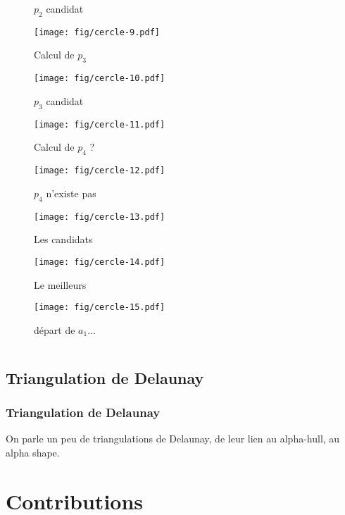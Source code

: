 \documentclass{beamer}
\begin{document}
\begin{frame}
\begin{columns}[t]
\begin{column}{4cm}
{\begin{figure}[h!]
    \caption{$p_{2}$ candidat}
\end{figure}
}
{
  \begin{figure}[h!]
    \centering
    \texttt{[image: fig/cercle-9.pdf]}
    \caption{Calcul de $p_{3}$}
\end{figure}
}
{
  \begin{figure}[h!]
    \centering
    \texttt{[image: fig/cercle-10.pdf]}
    \caption{$p_{3}$ candidat}
\end{figure}
}
{
  \begin{figure}[h!]
    \centering
    \texttt{[image: fig/cercle-11.pdf]}
    \caption{Calcul de $p_{4}$ ?}
\end{figure}
}
{
  \begin{figure}[h!]
    \centering
    \texttt{[image: fig/cercle-12.pdf]}
    \caption{$p_{4}$ n'existe pas}
\end{figure}
}
{
  \begin{figure}[h!]
    \centering
    \texttt{[image: fig/cercle-13.pdf]}
    \caption{Les candidats}
\end{figure}
}
{
  \begin{figure}[h!]
    \centering
    \texttt{[image: fig/cercle-14.pdf]}
    \caption{Le meilleurs}
\end{figure}
}
{
  \begin{figure}[h!]
    \centering
    \texttt{[image: fig/cercle-15.pdf]}
    \caption{départ de $a_1$...}
\end{figure}
}


  \end{column}
\end{columns} 

\end{frame}
    
\subsection{Triangulation de Delaunay}  %
\begin{frame}
\frametitle{Triangulation de Delaunay}
On parle un peu de triangulations de Delaunay, de leur lien au alpha-hull, au alpha shape.
\end{frame}

\section{Contributions}
\end{document}
